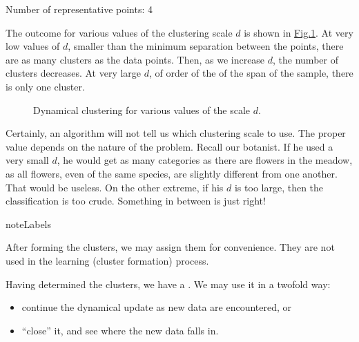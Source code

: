 \documentclass[letterpaper,10pt,english]{jupyterBook}
\let\sphinxpxdimen\pdfpxdimen\else\newdimen\sphinxpxdimen
\begin{document}
\begin{sphinxVerbatim}[commandchars=\\\{\}]
\end{sphinxVerbatim}

\begin{sphinxVerbatim}[commandchars=\\\{\}]
Number of representative points:  4
\end{sphinxVerbatim}

\sphinxAtStartPar
The outcome for various values of the clustering scale \(d\) is shown in \hyperref[\detokenize{docs/unsupervised:dyn-fig}]{Fig.\@ \ref{\detokenize{docs/unsupervised:dyn-fig}}}. At very low values of \(d\), smaller than the minimum separation between the points, there are as many clusters as the data points. Then, as we increase \(d\), the number of clusters decreases. At very large \(d\), of order of the of the span of the sample, there is only one cluster.

\begin{figure}[htbp]
\centering
\capstart

\noindent\sphinxincludegraphics[width=770\sphinxpxdimen]{{cd}.jpg}
\caption{Dynamical clustering for various values of the scale \(d\).}\label{\detokenize{docs/unsupervised:dyn-fig}}\end{figure}

\sphinxAtStartPar
Certainly, an algorithm will not tell us which clustering scale to use. The proper value depends on the nature of the problem. Recall our botanist. If he used a very small \(d\), he would get as many categories as there are flowers in the meadow, as all flowers, even of the same species, are slightly different from one another. That would be useless. On the other extreme, if his \(d\) is too large, then the classification is too crude. Something in between is just right!

\begin{sphinxadmonition}{note}{Labels}

\sphinxAtStartPar
After forming the clusters, we may assign them  for convenience. They are not used in the learning (cluster formation) process.
\end{sphinxadmonition}

\sphinxAtStartPar
Having determined the clusters, we have a . We may use it in a two\sphinxhyphen{}fold way:
\begin{itemize}
\item {} 
\sphinxAtStartPar
continue the dynamical update as new data are encountered, or

\item {} 
\sphinxAtStartPar
“close” it, and see where the new data falls in.

\end{itemize}
\end{document}
